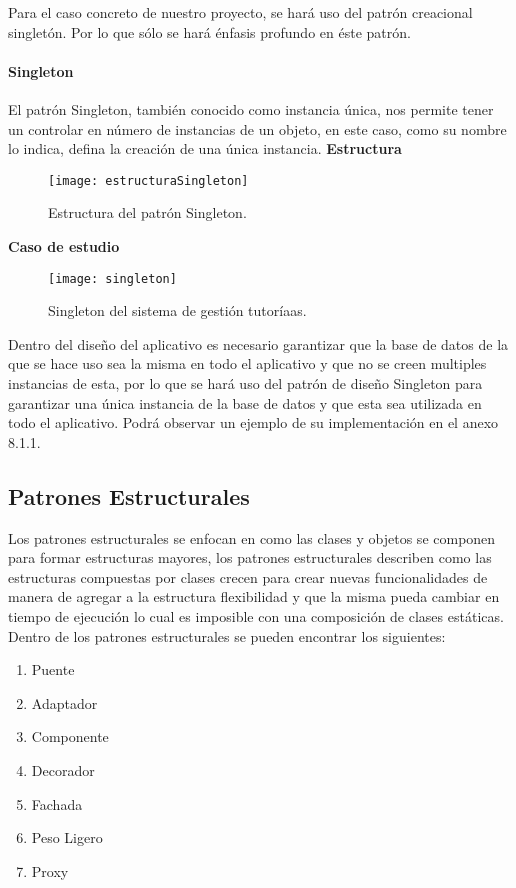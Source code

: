Para el caso concreto de nuestro proyecto, se hará uso del patrón creacional singletón. Por lo que sólo se hará énfasis profundo en éste patrón.
\newpage
\paragraph{Singleton}
El patrón Singleton, también conocido como instancia única, nos permite tener un controlar en número de instancias de un objeto, en este caso, como su nombre lo indica, defina la creación de una única instancia.
\newline
\indent\textbf{Estructura}
\newline
\begin{figure}[H]
	\centering
	\texttt{[image: estructuraSingleton]}
    \centering
    \caption{Estructura del patrón Singleton.}
	\label{fig:eSingleton}
\end{figure}
\indent\textbf{Caso de estudio}
\newline
\begin{figure}[H]
	\centering
	\texttt{[image: singleton]}
    \centering
    \caption{Singleton del sistema de gestión tutoríaas.}
	\label{fig:singleton}
\end{figure}

\indent Dentro del diseño del aplicativo es necesario garantizar que la base de datos de la que se hace uso sea la misma en todo el aplicativo y que no se creen multiples instancias de esta, por lo que se hará uso del patrón de diseño Singleton para garantizar una única instancia de la base de datos y que esta sea utilizada en todo el aplicativo. Podrá observar un ejemplo de su implementación en el anexo 8.1.1.
\newpage
\subsection{Patrones Estructurales}
Los patrones estructurales se enfocan en como las clases y objetos se componen para formar
estructuras mayores, los patrones estructurales describen como las estructuras compuestas por clases
crecen para crear nuevas funcionalidades de manera de agregar a la estructura flexibilidad y que la
misma pueda cambiar en tiempo de ejecución lo cual es imposible con una composición de clases
estáticas\cite{estruct}.
Dentro de los patrones estructurales se pueden encontrar los siguientes:
\begin{enumerate}
\item Puente
\item Adaptador
\item Componente
\item Decorador
\item Fachada
\item Peso Ligero
\item Proxy
\end{enumerate}

